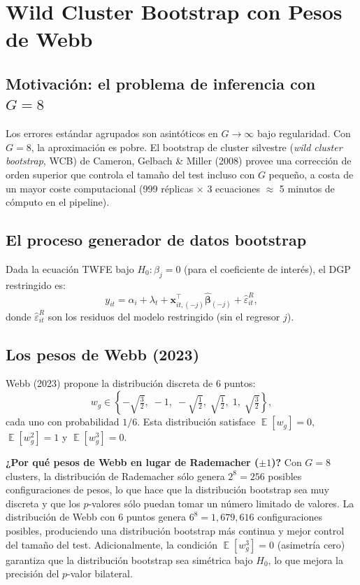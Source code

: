 \documentclass[12pt, a4paper]{article}
\theoremstyle{definition}
\DeclareMathOperator{\E}{\mathbb{E}}
\begin{document}
\section{Wild Cluster Bootstrap con Pesos de Webb}
\label{sec:bootstrap}

\subsection{Motivación: el problema de inferencia con $G = 8$}

Los errores estándar agrupados son asintóticos en $G \to \infty$ bajo regularidad. Con $G = 8$, la aproximación es pobre. El bootstrap de cluster silvestre (\textit{wild cluster bootstrap}, WCB) de Cameron, Gelbach \& Miller (2008) provee una corrección de orden superior que controla el tamaño del test incluso con $G$ pequeño, a costa de un mayor coste computacional (999 réplicas $\times$ 3 ecuaciones $\approx$ 5 minutos de cómputo en el pipeline).

\subsection{El proceso generador de datos bootstrap}

Dada la ecuación TWFE bajo $H_0: \beta_j = 0$ (para el coeficiente de interés), el DGP restringido es:
\[
  y_{it} = \alpha_i + \lambda_t + \bm{x}_{it,(-j)}^\top\hat{\bm{\beta}}_{(-j)} + \hat\varepsilon^R_{it},
\]
donde $\hat\varepsilon^R_{it}$ son los residuos del modelo restringido (sin el regresor $j$).

\subsection{Los pesos de Webb (2023)}

Webb (2023) propone la distribución discreta de 6 puntos:
\[
  w_g \in \left\{-\sqrt{\tfrac{3}{2}},\; -1,\; -\sqrt{\tfrac{1}{2}},\; \sqrt{\tfrac{1}{2}},\; 1,\; \sqrt{\tfrac{3}{2}}\right\},
\]
cada uno con probabilidad $1/6$. Esta distribución satisface $\E[w_g] = 0$, $\E[w_g^2] = 1$ y $\E[w_g^3] = 0$.

\begin{intuitionbox}
\textbf{¿Por qué pesos de Webb en lugar de Rademacher ($\pm 1$)?} Con $G = 8$ clusters, la distribución de Rademacher sólo genera $2^8 = 256$ posibles configuraciones de pesos, lo que hace que la distribución bootstrap sea muy discreta y que los $p$-valores sólo puedan tomar un número limitado de valores. La distribución de Webb con 6 puntos genera $6^8 = 1{,}679{,}616$ configuraciones posibles, produciendo una distribución bootstrap más continua y mejor control del tamaño del test. Adicionalmente, la condición $\E[w_g^3] = 0$ (asimetría cero) garantiza que la distribución bootstrap sea simétrica bajo $H_0$, lo que mejora la precisión del $p$-valor bilateral.
\end{intuitionbox}
\end{document}
